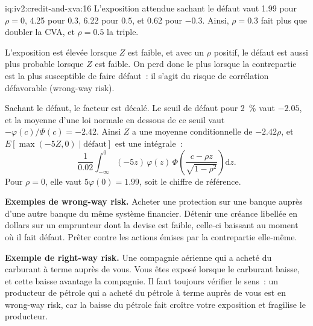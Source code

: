 \begin{solution}{iq:iv2:credit-and-xva:16}
L'exposition attendue sachant le défaut vaut 1.99 pour $\rho = 0$, 4.25 pour $0.3$, 6.22 pour $0.5$, et 0.62 pour $-0.3$. Ainsi, $\rho = 0.3$ fait plus que doubler la CVA, et $\rho = 0.5$ la triple.

L'exposition est élevée lorsque $Z$ est faible, et avec un $\rho$ positif, le défaut est aussi plus probable lorsque $Z$ est faible. On perd donc le plus lorsque la contrepartie est la plus susceptible de faire défaut~: il s'agit du risque de corrélation défavorable (wrong-way risk).

Sachant le défaut, le facteur est décalé. Le seuil de défaut pour 2~\% vaut $-2.05$, et la moyenne d'une loi normale en dessous de ce seuil vaut $-\varphi(c)/\Phi(c) = -2.42$. Ainsi $Z$ a une moyenne conditionnelle de $-2.42\rho$, et $E[\max(-5Z, 0) \mid \text{défaut}]$ est une intégrale~:
\[
\frac{1}{0.02}\int_{-\infty}^{0} (-5z)\,\varphi(z)\,\Phi\!\left(\frac{c - \rho z}{\sqrt{1 - \rho^2}}\right)\mathrm{d}z.
\]
Pour $\rho = 0$, elle vaut $5\varphi(0) = 1.99$, soit le chiffre de référence.

\textbf{Exemples de wrong-way risk.} Acheter une protection sur une banque auprès d'une autre banque du même système financier. Détenir une créance libellée en dollars sur un emprunteur dont la devise est faible, celle-ci baissant au moment où il fait défaut. Prêter contre les actions émises par la contrepartie elle-même.

\textbf{Exemple de right-way risk.} Une compagnie aérienne qui a acheté du carburant à terme auprès de vous. Vous êtes exposé lorsque le carburant baisse, et cette baisse avantage la compagnie. Il faut toujours vérifier le sens~: un producteur de pétrole qui a acheté du pétrole à terme auprès de vous est en wrong-way risk, car la baisse du pétrole fait croître votre exposition et fragilise le producteur.

\end{solution}

